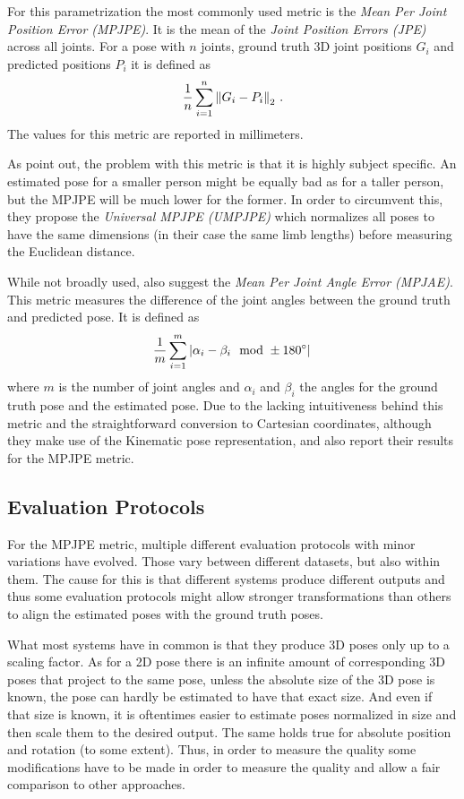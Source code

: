 For this parametrization the most commonly used metric is the \emph{Mean Per Joint Position Error (MPJPE)}.
It is the mean of the \emph{Joint Position Errors (JPE)} across all joints.
For a pose with $n$ joints, ground truth 3D joint positions $G_i$ and predicted positions $P_i$ it is defined as
\begin{equation}
\frac{1}{n} \sum_{i = 1}^{n}  \norm{G_i - P_i}_2 \ .
\end{equation}
The values for this metric are reported in millimeters.

As \citet{ionescu14} point out, the problem with this metric is that it is highly subject specific.
An estimated pose for a smaller person might be equally bad as for a taller person, but the MPJPE will be much lower for the former.
In order to circumvent this, they propose the \emph{Universal MPJPE (UMPJPE)} which normalizes all poses to have the same dimensions (in their case the same limb lengths) before measuring the Euclidean distance.

While not broadly used, \citet{ionescu14} also suggest the \emph{Mean Per Joint Angle Error (MPJAE)}.
This metric measures the difference of the joint angles between the ground truth and predicted pose.
It is defined as
\begin{equation}
\frac{1}{m} \sum_{i = 1}^{m} \abs{\alpha_i - \beta_i \mod \pm 180\degree} \,
\end{equation}
where $m$ is the number of joint angles and $\alpha_i$ and $\beta_i$ the angles for the ground truth pose and the estimated pose.
Due to the lacking intuitiveness behind this metric and the straightforward conversion to Cartesian coordinates, although they make use of the Kinematic pose representation, \citet{jahangiri17} and \citet{zhou16_2} also report their results for the MPJPE metric.

\subsection{Evaluation Protocols}

For the MPJPE metric, multiple different evaluation protocols with minor variations have evolved.
Those vary between different datasets, but also within them.
The cause for this is that different systems produce different outputs and thus some evaluation protocols might allow stronger transformations than others to align the estimated poses with the ground truth poses.

What most systems have in common is that they produce 3D poses only up to a scaling factor.
As for a 2D pose there is an infinite amount of corresponding 3D poses that project to the same pose, unless the absolute size of the 3D pose is known, the pose can hardly be estimated to have that exact size.
And even if that size is known, it is oftentimes easier to estimate poses normalized in size and then scale them to the desired output.
The same holds true for absolute position and rotation (to some extent).
Thus, in order to measure the quality some modifications have to be made in order to measure the quality and allow a fair comparison to other approaches.

